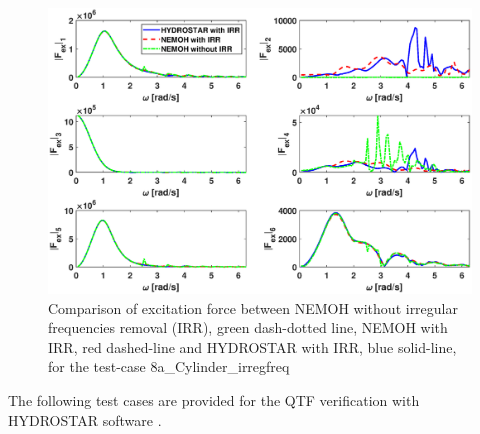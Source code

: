 \documentclass[12pt,a4paper,titlepage]{article}
\begin{document}
\begin{itemize}
\begin{figure}[h!tbp]
\includegraphics[scale=0.5,trim = 10mm 0mm 30mm 0mm, clip]{figures/Cylinder/excForce.eps}	

\caption{Comparison of excitation force between NEMOH without irregular frequencies removal (IRR), green dash-dotted line, NEMOH with IRR, red dashed-line and HYDROSTAR with IRR, blue solid-line, for the test-case 8a\_Cylinder\_irregfreq}\label{fig:Cylinder_IRR_excforce}
\end{figure}

\end{itemize}

\FloatBarrier

The following test cases are provided for the QTF verification with HYDROSTAR software \cite{HYDROSTAR}.
\end{document}
